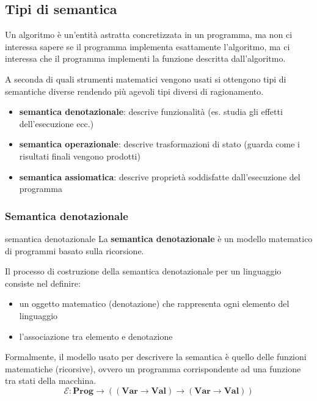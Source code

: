 \subsection{Tipi di semantica}
Un algoritmo è un'entità astratta concretizzata in un programma, ma non ci interessa sapere se il programma implementa esattamente l'algoritmo, ma ci interessa che il programma implementi la funzione descritta dall'algoritmo.

\smallskip
A seconda di quali strumenti matematici vengono usati si ottengono tipi di semantiche diverse rendendo più agevoli tipi diversi di ragionamento.
\begin{itemize}[label=$\triangleright$, itemsep=\smallskipamount]
    \item \textbf{semantica denotazionale}: descrive funzionalità (es. studia gli effetti dell'esecuzione ecc.)
    \item \textbf{semantica operazionale}: descrive trasformazioni di stato (guarda come i risultati finali vengono prodotti)
    \item \textbf{semantica assiomatica}: descrive proprietà soddisfatte dall'esecuzione del programma 
\end{itemize}

\subsubsection{Semantica denotazionale}
\begin{mydef}{semantica denotazionale}
    La \textbf{semantica denotazionale} è un modello matematico di programmi basato sulla ricorsione.
\end{mydef}

Il processo di costruzione della semantica denotazionale per un linguaggio consiste nel definire:
\begin{itemize}[label=$\diamond$, itemsep=\smallskipamount]
    \item un oggetto matematico (denotazione) che rappresenta ogni elemento del linguaggio
    \item l'associazione tra elemento e denotazione
\end{itemize}

Formalmente, il modello usato per descrivere la semantica è quello delle funzioni matematiche (ricorsive), ovvero un programma  corrispondente ad una funzione tra stati della macchina.
\[
    \mathbf{\mathcal{E}: Prog \rightarrow ((Var \rightarrow Val) \rightarrow (Var \rightarrow Val))}
\]

